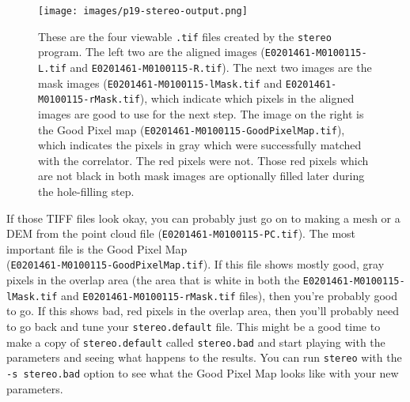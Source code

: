 \begin{figure}
\begin{center}
\texttt{[image: images/p19-stereo-output.png]}
\caption[P19 stereo output images]{
    \label{p19-stereo-output}
	These are the four viewable \texttt{.tif} files created by
	the \texttt{stereo} program.  The left two are the aligned
	images (\texttt{E0201461-M0100115-L.tif} and
	\texttt{E0201461-M0100115-R.tif}).  The next two images are
	the mask images (\texttt{E0201461-M0100115-lMask.tif} and
	\texttt{E0201461-M0100115-rMask.tif}), which indicate which
	pixels in the aligned images are good to use for the next
	step.  The image on the right is the Good Pixel map
	(\texttt{E0201461-M0100115-GoodPixelMap.tif}), which indicates
	the pixels in gray which were successfully matched with the
	correlator.  The red pixels were not.  Those red pixels which
	are not black in both mask images are optionally filled later
	during the hole-filling step.
    }
\end{center}
\end{figure}

%

If those TIFF files look okay, you can probably just go on to making
a mesh or a \ac{DEM} from the point cloud file
(\texttt{E0201461-M0100115-PC.tif}).  The most important file is
the Good Pixel Map \\ (\texttt{E0201461-M0100115-GoodPixelMap.tif}).
If this file shows mostly good, gray pixels in the overlap area
(the area that is white in both the \texttt{E0201461-M0100115-lMask.tif}
and \texttt{E0201461-M0100115-rMask.tif} files), then you're probably
good to go.  If this shows bad, red pixels in the overlap area,
then you'll probably need to go back and tune your \texttt{stereo.default}
file.  This might be a good time to make a copy of \texttt{stereo.default}
called \texttt{stereo.bad} and start playing with the parameters
and seeing what happens to the results.  You can run \texttt{stereo}
with the \texttt{-s stereo.bad} option to see what the Good Pixel
Map looks like with your new parameters.

